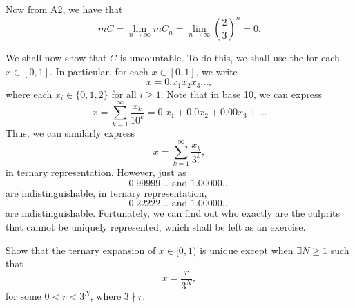 \documentclass[notoc,notitlepage]{tufte-book}
\begin{document}
\begin{eg}
  Now from A2, we have that
  \begin{equation*}
    m C = \lim_{n \to \infty} m C_n = \lim_{n \to \infty} \left( \frac{2}{3}
    \right)^n = 0.
  \end{equation*}

  We shall now show that $C$ is uncountable. To do this, we shall use the
   for each $x \in [0, 1]$. In particular, for
  each $x \in [0, 1]$, we write
  \begin{equation*}
    x = 0.x_1 x_2 x_3 \hdots,
  \end{equation*}
  where each $x_i \in \{ 0, 1, 2 \}$ for all $i \geq 1$. Note that in base 10,
  we can express
  \begin{equation*}
    x = \sum_{k=1}^{\infty} \frac{x_k}{10^k} = 0.x_1 + 0.0x_2 + 0.00x_3 + \hdots
  \end{equation*}
  Thus, we can similarly express
  \begin{equation*}
    x = \sum_{k=1}^{\infty} \frac{x_k}{3^k},
  \end{equation*}
  in ternary representation. However, just as
  \begin{equation*}
    0.99999 \hdots \text{ and } 1.00000 \hdots
  \end{equation*}
  are indistinguishable, in ternary representation,
  \begin{equation*}
    0.22222 \hdots \text{ and } 1.00000 \hdots
  \end{equation*}
  are indistinguishable. Fortunately, we can find out who exactly are the
  culprits that cannot be uniquely represented, which shall be left as an
  exercise.

  \begin{ex}
    Show that the ternary expansion of $x \in [0, 1)$ is unique except when
    $\exists N \geq 1$ such that
    \begin{equation*}
      x = \frac{r}{3^N},
    \end{equation*}
    for some $0 < r < 3^N$, where $3 \nmid r$.
  \end{ex}


\end{eg}
\end{document}
